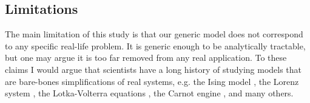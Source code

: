 \subsection{Limitations}\label{subsec:limitations}
The main limitation of this study is that our generic model does not
correspond to any specific real-life problem. It is generic enough to
be analytically tractable, but one may argue it is too far removed
from any real application. To these claims I would argue that
scientists have a long history of studying models that are bare-bones
simplifications of real systems, e.g. the Ising model
\cite{cipra1987}, the Lorenz system \cite{brin}, the Lotka-Volterra
equations \cite{logan2006}, the Carnot engine \cite{kardar2007}, and
many others.
